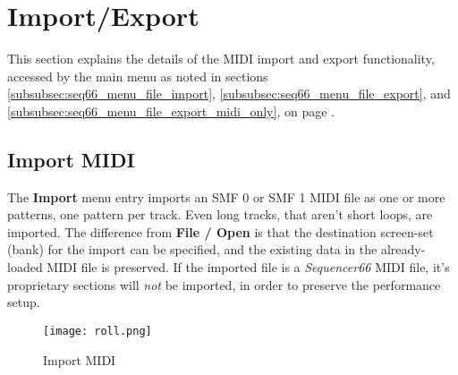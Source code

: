 %
%
%

\section{Import/Export}
\label{sec:seq66_midi_export}

   This section explains the details of the MIDI import and export
   functionality, accessed by the main menu as noted in
   sections
   \ref{subsubsec:seq66_menu_file_import},
   \ref{subsubsec:seq66_menu_file_export}, and
   \ref{subsubsec:seq66_menu_file_export_midi_only}, on page
   \pageref{subsubsec:seq66_menu_file_import}.


\subsection{Import MIDI}
\label{subsec:seq66_midi_export_file_import}

   The \textbf{Import} menu entry imports an SMF 0
   or SMF 1 MIDI file as one or more patterns, one pattern per track.
   Even long tracks, that aren't short loops, are imported.
   The difference from \textbf{File / Open} is that the destination screen-set
   (bank) for the import can be specified, and the existing data in the
   already-loaded MIDI file is preserved.
   If the imported file is a
   \textsl{Sequencer66} MIDI file, it's proprietary sections will
   \textsl{not} be imported, in order to preserve the performance setup.

\begin{figure}[H]
   \centering 
   \texttt{[image: roll.png]}
   \caption{Import MIDI}
   \label{fig:seq66_midi_export_file_import}
\end{figure}

